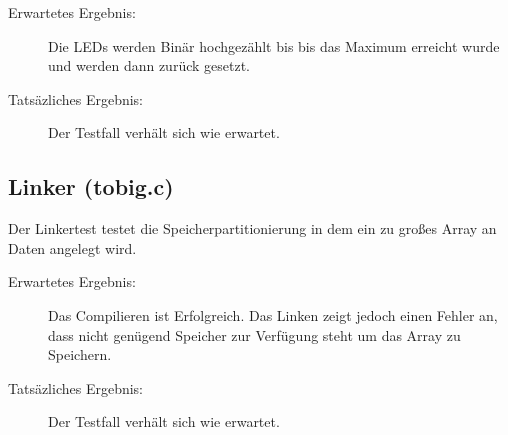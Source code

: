             \begin{description}
                \item[Erwartetes Ergebnis:] Die LEDs werden Binär hochgezählt bis
                bis das Maximum erreicht wurde und werden dann zurück gesetzt.
                \item[Tatsäzliches Ergebnis:] Der Testfall verhält sich wie erwartet.
            \end{description}

        \subsection{Linker (tobig.c)}
            Der Linkertest testet die Speicherpartitionierung in dem ein zu großes
            Array an Daten angelegt wird.

            \begin{description}
                \item[Erwartetes Ergebnis:] Das Compilieren ist Erfolgreich.
                Das Linken zeigt jedoch einen Fehler an, dass nicht genügend Speicher
                zur Verfügung steht um das Array zu Speichern. 
                \item[Tatsäzliches Ergebnis:] Der Testfall verhält sich wie erwartet.
            \end{description}


